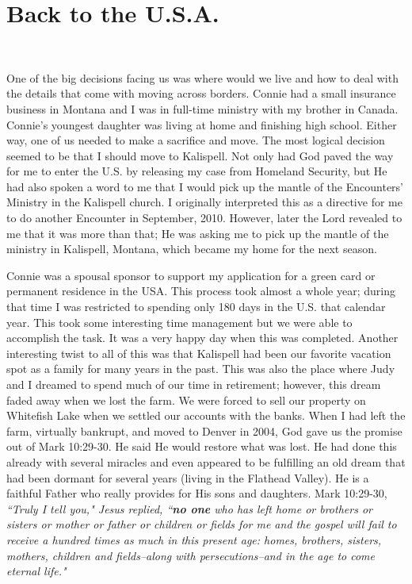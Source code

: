 \documentclass[oneside,12pt]{book}
\begin{document}
\section{Back to the U.S.A.}
\

One of the big decisions facing us was where would we live and how to deal with the details that come with moving across borders. Connie had a small insurance business in Montana and I was in full-time ministry with my brother in Canada. Connie's youngest daughter was living at home and finishing high school. Either way, one of us needed to make a sacrifice and move. The most logical decision seemed to be that I should move to Kalispell. Not only had God paved the way for me to enter the U.S. by releasing my case from Homeland Security, but He had also spoken a word to me that I would pick up the mantle of the Encounters' Ministry in the Kalispell church. I originally interpreted this as a directive for me to do another Encounter in September, 2010. However, later the Lord revealed to me that it was more than that; He was asking me to pick up the mantle of the ministry in Kalispell, Montana, which became my home for the next season.

Connie was a spousal sponsor to support my application for a green card or permanent residence in the USA. This process took almost a whole year; during that time I was restricted to spending only 180 days in the U.S. that calendar year. This took some interesting time management but we were able to accomplish the task. It was a very happy day when this was completed. Another interesting twist to all of this was that Kalispell had been our favorite vacation spot as a family for many years in the past. This was also the place where Judy and I dreamed to spend much of our time in retirement; however, this dream faded away when we lost the farm. We were forced to sell our property on Whitefish Lake when we settled our accounts with the banks. When I had left the farm, virtually bankrupt, and moved to Denver in 2004, God gave us the promise out of Mark 10:29-30. He said He would restore what was lost. He had done this already with several miracles and even appeared to be fulfilling an old dream that had been dormant for several years (living in the Flathead Valley). He is a faithful Father who really provides for His sons and daughters. Mark 10:29-30, \textit{``Truly I tell you," Jesus replied, ``\textbf{no one} who has left home or brothers or sisters or mother or father or children or fields for me and the gospel will fail to receive a hundred times as much in this present age: homes, brothers, sisters, mothers, children and fields--along with persecutions--and in the age to come eternal life."}
\end{document}
